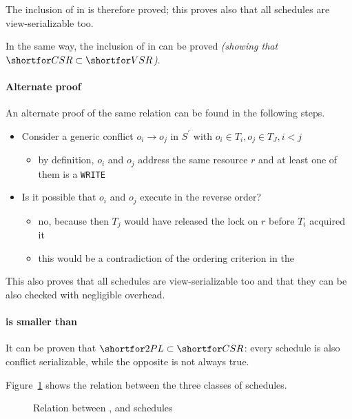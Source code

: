 \documentclass[english]{article}
\begin{document}
The inclusion of \tpl in \csr is therefore proved;
this proves also that all \tpl schedules are view-serializable too.

In the same way, the inclusion of \tpl in \vsr can be proved \textit{(showing that \(\csr \subset \vsr\))}.

\paragraph{Alternate proof}

An alternate proof of the same relation can be found in the following steps.

\begin{itemize}
  \item Consider a generic conflict \(o_i \rightarrow o_j\) in \(S^\prime\) with \(o_i \in T_i, o_j \in T_J, i < j\)
        \begin{itemize}
          \item by definition, \(o_i\) and \(o_j\) address the same resource \(r\) and at least one of them is a \texttt{WRITE}
        \end{itemize}
  \item Is it possible that \(o_i\) and \(o_j\) execute in the reverse order?
        \begin{itemize}
          \item no, because then \(T_j\) would have released the lock on \(r\) before \(T_i\) acquired it
          \item this would be a contradiction of the ordering criterion in the \tpl
        \end{itemize}
\end{itemize}

\bigskip
This also proves that all \tpl schedules are view-serializable too and that they can be also checked with negligible overhead.

\paragraph{\tpl is smaller than \csr}

It can be proven that \(\tpl \subset \csr\): every \tpl schedule is also conflict serializable, while the opposite is not always true.

\bigskip
Figure~\ref{fig:relation-between-tpl-csr-vsr-schedules} shows the relation between the three classes of schedules.

\begin{figure}[htbp]
  \centering
  \bigskip
  \caption{Relation between \tpl, \csr and \vsr schedules}
  \label{fig:relation-between-tpl-csr-vsr-schedules}
  \bigskip
\end{figure}
\end{document}
